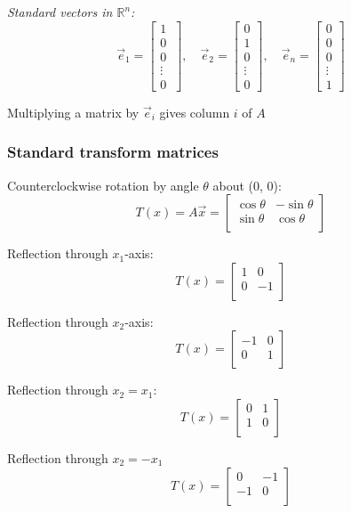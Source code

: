 \documentclass[12pt]{article} %
\newcommand{\R}{\mathbb{R}}
\begin{document}
\emph{Standard vectors in $\R^n$:}
$$\vec{e}_1 = \begin{bmatrix}
	1\\0\\0\\\vdots\\0\
\end{bmatrix}, \quad \vec{e}_2 = \begin{bmatrix}
	0\\1\\0\\\vdots\\0
\end{bmatrix}, \quad \vec{e}_n = \begin{bmatrix}
	0\\0\\0\\\vdots\\1
\end{bmatrix}$$

Multiplying a matrix by $\vec{e}_i$ gives column $i$ of $A$

\subsubsection{Standard transform matrices}
Counterclockwise rotation by angle $\theta$ about (0, 0):
$$T(x) = A\vec{x} = \begin{bmatrix}
	\cos \theta & -\sin \theta\\
	\sin \theta & \cos \theta\\
\end{bmatrix}$$

Reflection through $x_1$-axis:
$$T(x) = \begin{bmatrix}
	1 & 0\\
	0 & -1\\
\end{bmatrix}$$

Reflection through $x_2$-axis:
$$T(x) = \begin{bmatrix}
	-1 & 0\\
	0 & 1\\
\end{bmatrix}$$

Reflection through $x_2 = x_1$:
$$T(x) = \begin{bmatrix}
	0 & 1\\
	1 & 0\\
\end{bmatrix}$$

Reflection through $x_2 = -x_1$
$$T(x) = \begin{bmatrix}
	0 & -1\\
	-1 & 0\\
\end{bmatrix}$$
\end{document}

